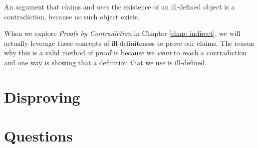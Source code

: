 \documentclass[../proofs.tex]{subfiles}
\begin{document}
An argument that claims and uses the existence of an ill-defined object is
a contradiction, because no such object exists.

When we explore \emph{Proofs by Contradiction} in Chapter \ref{chap: indirect},
we will actually leverage these concepts of ill-definiteness to prove our
claims.
The reason why this is a valid method of proof is because we \emph{want} to
reach a contradiction and one way is showing that a definition that we use is
ill-defined. %

\section{Disproving}


\section*{Questions}
\end{document}
